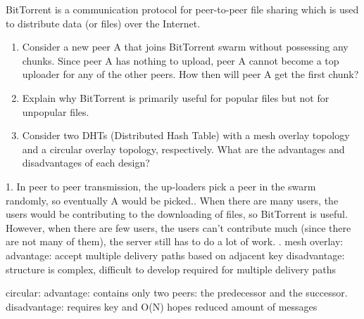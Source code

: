 \documentclass{report}
\begin{document}
\begin{problem}
BitTorrent is a communication protocol for peer-to-peer file sharing which is used to distribute data (or files) over the Internet.
	\begin{enumerate}
		
		\item Consider a new peer A that joins BitTorrent swarm without possessing any chunks. Since peer A has nothing to upload, peer A cannot become a top uploader for any of the other peers. How then will peer A get the first chunk?
		
		\item Explain why BitTorrent is primarily useful for popular files but not for unpopular files.
		
		\item Consider two DHTs (Distributed Hash Table) with a mesh overlay topology and a circular overlay topology, respectively. What are the advantages and disadvantages of each design?
		
	\end{enumerate}

  \begin{answer}{35em}
  1. In peer to peer transmission, the up-loaders pick a peer in the swarm randomly, so eventually A would be picked.\newline {}. When there are many users, the users would be contributing to the downloading of files, so BitTorrent is useful. However, when there are few users, the users can't contribute much (since there are not many of them), the server still has to do a lot of work.\newline
  . \newline
  mesh overlay:\newline
  advantage: \newline
  accept multiple delivery paths\newline
  based on adjacent key\newline
  disadvantage: \newline
  structure is complex, difficult to develop\newline
  required for multiple delivery paths\newline
 
  circular:\newline
  advantage:\newline
  contains only two peers: the predecessor and the successor.\newline
  disadvantage:\newline
  requires key and O(N) hopes\newline
  reduced amount of messages\newline
  \end{answer}

\end{problem}
\end{document}
